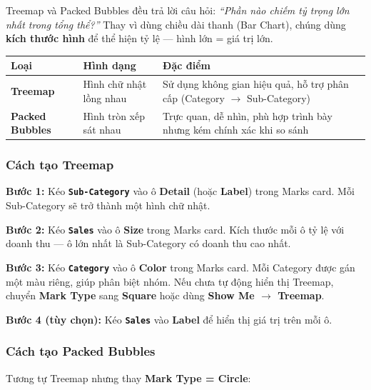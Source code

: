 \documentclass[12pt]{article}
\begin{document}
\noindent Treemap và Packed Bubbles đều trả lời câu hỏi: \textit{``Phần nào chiếm tỷ trọng lớn nhất trong tổng thể?''} Thay vì dùng chiều dài thanh (Bar Chart), chúng dùng \textbf{kích thước hình} để thể hiện tỷ lệ --- hình lớn = giá trị lớn.

\begin{center}
\renewcommand{\arraystretch}{1.4}
\begin{tabularx}{\linewidth}{l X X}
\toprule
\textbf{Loại} & \textbf{Hình dạng} & \textbf{Đặc điểm} \\
\midrule
\textbf{Treemap} & Hình chữ nhật lồng nhau & Sử dụng không gian hiệu quả, hỗ trợ phân cấp (Category $\rightarrow$ Sub-Category) \\
\textbf{Packed Bubbles} & Hình tròn xếp sát nhau & Trực quan, dễ nhìn, phù hợp trình bày nhưng kém chính xác khi so sánh \\
\bottomrule
\end{tabularx}
\end{center}

\subsubsection{Cách tạo Treemap}

\noindent \textbf{Bước 1:} Kéo \textbf{\texttt{Sub-Category}} vào ô \textbf{Detail} (hoặc \textbf{Label}) trong Marks card. Mỗi Sub-Category sẽ trở thành một hình chữ nhật.

\noindent \textbf{Bước 2:} Kéo \textbf{\texttt{Sales}} vào ô \textbf{Size} trong Marks card. Kích thước mỗi ô tỷ lệ với doanh thu --- ô lớn nhất là Sub-Category có doanh thu cao nhất.

\noindent \textbf{Bước 3:} Kéo \textbf{\texttt{Category}} vào ô \textbf{Color} trong Marks card. Mỗi Category được gán một màu riêng, giúp phân biệt nhóm. Nếu chưa tự động hiển thị Treemap, chuyển \textbf{Mark Type} sang \textbf{Square} hoặc dùng \textbf{Show Me $\rightarrow$ Treemap}.

\noindent \textbf{Bước 4 (tùy chọn):} Kéo \textbf{\texttt{Sales}} vào \textbf{Label} để hiển thị giá trị trên mỗi ô.

\subsubsection{Cách tạo Packed Bubbles}

\noindent Tương tự Treemap nhưng thay \textbf{Mark Type = Circle}:
\end{document}
